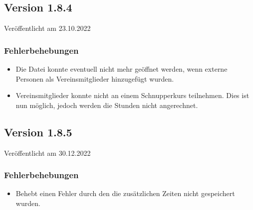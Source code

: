 \begin{neu}
\subsection{Version 1.8.4}
\label{version:1:8:4}
Veröffentlicht am 23.10.2022
\subsubsection{Fehlerbehebungen}
\begin{itemize}
  \item
  Die Datei konnte eventuell nicht mehr geöffnet werden,
  wenn externe Personen als Vereinsmitglieder hinzugefügt wurden.
  \item
  Vereinsmitglieder konnte nicht an einem Schnupperkurs teilnehmen.
  Dies ist nun möglich, jedoch werden die Stunden nicht angerechnet.
\end{itemize}

\subsection{Version 1.8.5}
\label{version:1:8:5}
Veröffentlicht am 30.12.2022
\subsubsection{Fehlerbehebungen}
\begin{itemize}
  \item
  Behebt einen Fehler durch den die zusätzlichen Zeiten nicht gespeichert wurden.
\end{itemize}
\end{neu}
